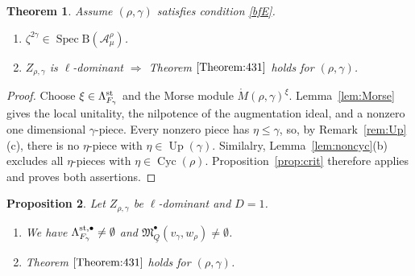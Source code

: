 \documentclass[11pt,reqno]{amsart}
\newtheorem{Theorem}{Theorem}[section]
\newtheorem{Proposition}[Theorem]{Proposition}
\theoremstyle{definition}
\theoremstyle{remark}
\def\dQ{\underline Q}
\def\B{\mathrm B}
\def\calA{\mathcal A}
\def\Spec{\operatorname{Spec}}
\def\Up{\operatorname{Up}}
\def\Cyc{\operatorname{Cyc}}
\def\M{\mathfrak M}
\begin{document}
\begin{Theorem}\label{thm:point}Assume  $(\rho,\gamma)$ satisfies condition \eqref{bfE}.\hfill
\begin{enumerate}[label=$\mathrm{(\alph*)}$,leftmargin=8mm]
\item
$\zeta^{2\gamma}\in\Spec\B(\calA^\rho_\mu)$. 
\item
$Z_{\rho,\gamma}$ is $\ell$-dominant $\Rightarrow$ Theorem $\ref{Theorem:431}$ holds for $(\rho,\gamma)$.
\end{enumerate}
\end{Theorem}

\begin{proof}
Choose $\xi\in\Lambda_{F_\gamma}^{\rm st}$ and the Morse module
$\mathring M(\rho,\gamma)^\xi$. Lemma~\ref{lem:Morse} gives the local
unitality, the nilpotence of the augmentation ideal, and a nonzero
one dimensional $\gamma$-piece. Every nonzero piece has
$\eta\leqslant\gamma$, so, by Remark~\ref{rem:Up}(c), there is no $\eta$-piece with
$\eta\in\Up(\gamma)$. Similalry, Lemma~\ref{lem:noncyc}(b) excludes all $\eta$-pieces with $\eta\in\Cyc(\rho)$.
Proposition~\ref{prop:crit} therefore applies and proves both assertions.
\end{proof}

\begin{Proposition}\label{prop:topdown}
Let $Z_{\rho,\gamma}$ be $\ell$-dominant and $D=1$. 
\begin{enumerate}[label=$\mathrm{(\alph*)}$,leftmargin=8mm]
\item
We have $\Lambda_{F_\gamma}^{\rm st,\bullet}\neq\emptyset$ and $\M_{\dQ}^\bullet(v_\gamma,w_\rho)\neq\emptyset$.
\item
Theorem $\ref{Theorem:431}$ holds for $(\rho,\gamma)$.
\end{enumerate}
\end{Proposition}
\end{document}
